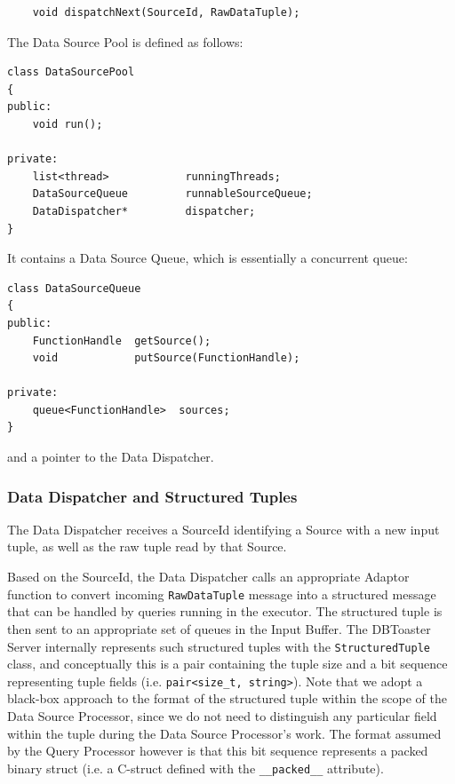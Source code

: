 \documentclass[14pt]{article}
\newcommand{\comment}[1]{}
\begin{document}
\begin{Verbatim}
    void dispatchNext(SourceId, RawDataTuple);
\end{Verbatim}

\noindent The Data Source Pool is defined as follows:

\begin{Verbatim}
class DataSourcePool
{
public:
    void run();

private:
    list<thread>            runningThreads;
    DataSourceQueue         runnableSourceQueue;
    DataDispatcher*         dispatcher;
}
\end{Verbatim}

\noindent It contains a Data Source Queue, which is essentially a concurrent queue:

\begin{Verbatim}
class DataSourceQueue
{
public:
    FunctionHandle  getSource();
    void            putSource(FunctionHandle);

private:
    queue<FunctionHandle>  sources;
}
\end{Verbatim}

\noindent and a pointer to the Data Dispatcher.

\subsubsection{Data Dispatcher and Structured Tuples}

The Data Dispatcher receives a SourceId identifying a Source with a new input
tuple, as well as the raw tuple read by that Source.

\comment{
\begin{itemize}
\item {\tt dispatchNext(readerID, rawDataTuple);}
\end{itemize}
}

Based on the SourceId, the Data Dispatcher calls an appropriate Adaptor function
to convert incoming {\tt RawDataTuple} message into a structured message that
can be handled by queries running in the executor. The structured tuple is then sent
to an appropriate set of queues in the Input Buffer. The DBToaster Server
internally represents such structured tuples with the \texttt{StructuredTuple}
class, and conceptually this is a pair containing the tuple size and a bit
sequence representing tuple fields (i.e. \texttt{pair<size\_t, string>}). Note
that we adopt a black-box approach to the format of the structured tuple within
the scope of the Data Source Processor, since we do not need to distinguish any
particular field within the tuple during the Data Source Processor's work. The
format assumed by the Query Processor however is that this bit sequence
represents a packed binary struct (i.e. a C-struct defined with the
\texttt{\_\_packed\_\_} attribute).
\end{document}
